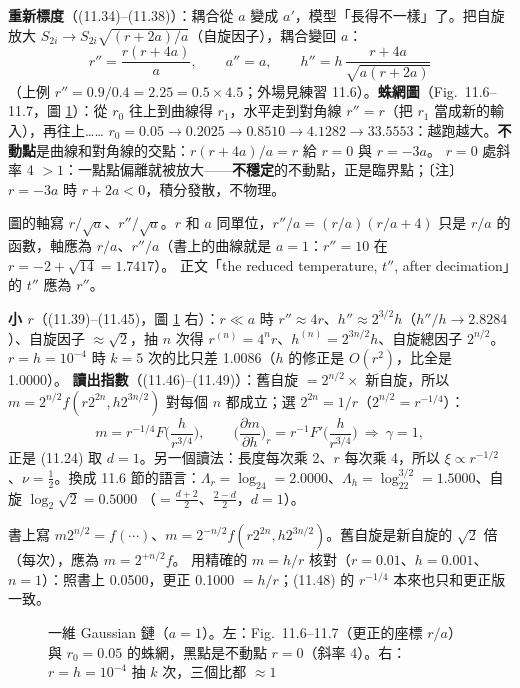\textbf{重新標度}（(11.34)--(11.38)）：耦合從 $a$ 變成 $a'$，模型「長得不一樣」了。把自旋放大 $S_{2i}\to S_{2i}\sqrt{(r+2a)/a}$（自旋因子），耦合變回 $a$：
\[r''=\frac{r(r+4a)}a,\qquad a''=a,\qquad h''=h\,\frac{r+4a}{\sqrt{a(r+2a)}}\tag{11.36--11.38}\]
（上例 $r''=0.9/0.4=2.25=0.5\times4.5$；外場見練習 11.6）。\textbf{蛛網圖}（Fig.~11.6--11.7，圖 \ref{eleven-fig-chain}）：從 $r_0$ 往上到曲線得 $r_1$，水平走到對角線 $r''=r$（把 $r_1$ 當成新的輸入），再往上……
$r_0=0.05\to0.2025\to0.8510\to4.1282\to33.5553$：越跑越大。\textbf{不動點}是曲線和對角線的交點：$r(r+4a)/a=r$ 給 $r=0$ 與 $r=-3a$。
$r=0$ 處斜率 4 $>1$：一點點偏離就被放大——\textbf{不穩定}的不動點，正是臨界點；〔注〕$r=-3a$ 時 $r+2a<0$，積分發散，不物理。
\begin{errbox}[pp.~267--268，Fig.~11.6--11.7；p.~267 正文]
圖的軸寫 $r/\sqrt a$、$r''/\sqrt a$。$r$ 和 $a$ 同單位，$r''/a=(r/a)(r/a+4)$ 只是 $r/a$ 的函數，軸應為 $r/a$、$r''/a$（書上的曲線就是 $a=1$：$r''=10$ 在 $r=-2+\sqrt{14}=1.7417$）。
正文「the reduced temperature, $t''$, after decimation」的 $t''$ 應為 $r''$。
\end{errbox}

\textbf{小 $r$}（(11.39)--(11.45)，圖 \ref{eleven-fig-chain} 右）：$r\ll a$ 時 $r''\approx4r$、$h''\approx2^{3/2}h$（$h''/h\to2.8284$）、自旋因子 $\approx\sqrt2$，抽 $n$ 次得
$r^{(n)}=4^nr$、$h^{(n)}=2^{3n/2}h$、自旋總因子 $2^{n/2}$。$r=h=10^{-4}$ 時 $k=5$ 次的比只差 1.0086（$h$ 的修正是 $O(r^2)$，比全是 1.0000）。
\textbf{讀出指數}（(11.46)--(11.49)）：舊自旋 $=2^{n/2}\times$ 新自旋，所以 $m=2^{n/2}f(r2^{2n},h2^{3n/2})$ 對每個 $n$ 都成立；選 $2^{2n}=1/r$（$2^{n/2}=r^{-1/4}$）：
\[m=r^{-1/4}F\Big(\frac h{r^{3/4}}\Big),\qquad\Big(\frac{\partial m}{\partial h}\Big)_r=r^{-1}F'\Big(\frac h{r^{3/4}}\Big)\ \Rightarrow\ \gamma=1,\tag{11.48--11.49}\]
正是 (11.24) 取 $d=1$。另一個讀法：長度每次乘 2、$r$ 每次乘 4，所以 $\xi\propto r^{-1/2}$、$\nu=\frac12$。換成 11.6 節的語言：$\Lambda_r=\log_24=2.0000$、$\Lambda_h=\log_22^{3/2}=1.5000$、自旋 $\log_2\sqrt2=0.5000$
（$=\frac{d+2}2$、$\frac{2-d}2$，$d=1$）。
\begin{errbox}[p.~269，(11.46)(11.47)]
書上寫 $m2^{n/2}=f(\cdots)$、$m=2^{-n/2}f(r2^{2n},h2^{3n/2})$。舊自旋是新自旋的 $\sqrt2$ 倍（每次），應為 $m=2^{+n/2}f$。
用精確的 $m=h/r$ 核對（$r=0.01$、$h=0.001$、$n=1$）：照書上 0.0500，更正 0.1000 $=h/r$；(11.48) 的 $r^{-1/4}$ 本來也只和更正版一致。
\end{errbox}

\begin{figure}[htbp]
\centering
\begin{minipage}[c]{0.56\linewidth}\centering\ElevenFigChain\end{minipage}\hfill
\begin{minipage}[c]{0.42\linewidth}\centering\footnotesize\setlength{\tabcolsep}{4pt}\ElevenTabSmallR\end{minipage}
\caption{一維 Gaussian 鏈（$a=1$）。左：Fig.~11.6--11.7（更正的座標 $r/a$）與 $r_0=0.05$ 的蛛網，黑點是不動點 $r=0$（斜率 4）。右：$r=h=10^{-4}$ 抽 $k$ 次，三個比都 $\approx1$}\label{eleven-fig-chain}
\end{figure}

